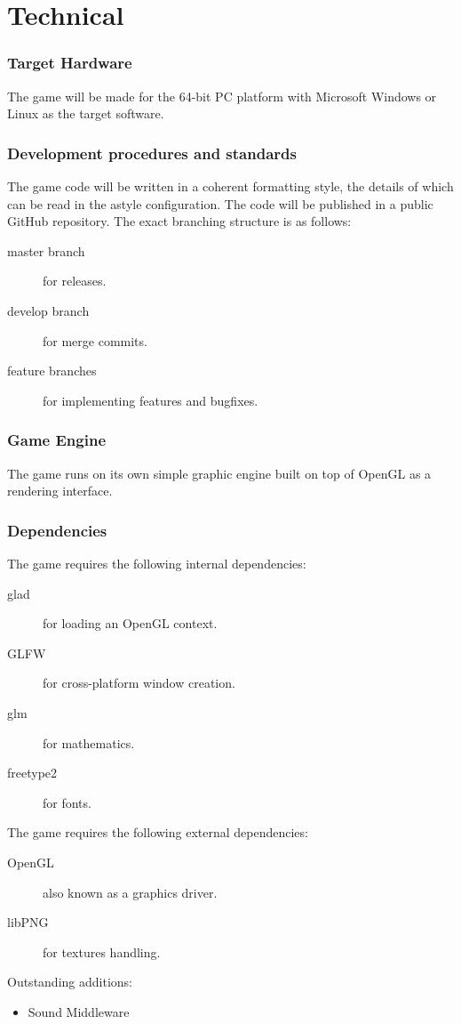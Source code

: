 \part{Technical}
\section{Target Hardware}
The game will be made for the 64-bit PC platform with Microsoft Windows
or Linux as the target software.
\section{Development procedures and standards}
The game code will be written in a coherent formatting style, the details of
which can be read in the astyle configuration. %
The code will be published in a public GitHub repository. The exact branching
structure is as follows:
\begin{description}
    \item[master branch] for releases.
    \item[develop branch] for merge commits.
    \item[feature branches] for implementing features and bugfixes.
\end{description}
\section{Game Engine}
The game runs on its own simple graphic engine built on top of OpenGL as a
rendering interface. %
\section{Dependencies}
The game requires the following internal dependencies:

\begin{description}
    \item[glad] for loading an OpenGL context.
    \item[GLFW] for cross-platform window creation.
    \item[glm] for mathematics.
    \item[freetype2] for fonts.
\end{description}

The game requires the following external dependencies:

\begin{description}
    \item[OpenGL] also known as a graphics driver.
    \item[libPNG] for textures handling.
\end{description}

Outstanding additions: %

\begin{itemize}
    \item Sound Middleware
\end{itemize}

